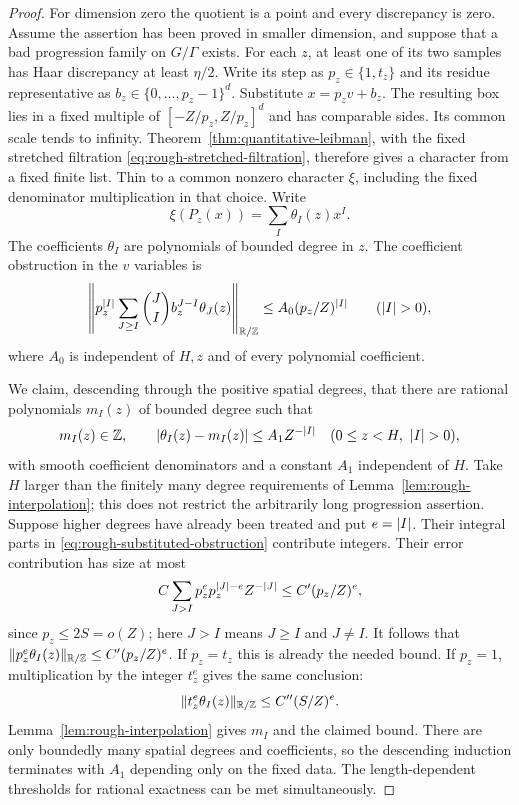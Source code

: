 \begin{proof}
For dimension zero the quotient is a point and every discrepancy is
zero.  Assume the assertion has been proved in smaller dimension, and
suppose that a bad progression family on $G/\Gamma$ exists.
For each $z$, at least one of its two samples has Haar discrepancy at
least $\eta/2$.  Write its step as $p_z\in\{1,t_z\}$ and its
residue representative as $b_z\in\{0,\ldots,p_z-1\}^d$.
Substitute $x=p_zv+b_z$.  The resulting box lies in a fixed multiple
of $[-Z/p_z,Z/p_z]^d$ and has comparable sides.  Its common scale
tends to infinity.  Theorem~\ref{thm:quantitative-leibman}, with the
fixed stretched filtration \eqref{eq:rough-stretched-filtration},
therefore gives a character from a fixed finite list.  Thin to a common
nonzero character $\xi$, including the fixed denominator multiplication
in that choice.  Write
\begin{equation}
 \xi(P_z(x))=\sum_I\theta_I(z)x^I.
 \label{eq:rough-character-polynomial}
\end{equation}
The coefficients $\theta_I$ are polynomials of bounded degree in $z$.
The coefficient obstruction in the $v$ variables is
\begin{equation}
 \left\|p_z^{\lvert I\rvert}
       \sum_{J\geq I}\binom JI b_z^{J-I}\theta_J(z)
       \right\|_{\mathbb R/\mathbb Z}
       \leq A_0(p_z/Z)^{\lvert I\rvert}
 \qquad(\lvert I\rvert>0),
 \label{eq:rough-substituted-obstruction}
\end{equation}
where $A_0$ is independent of $H,z$ and of every polynomial coefficient.

We claim, descending through the positive spatial degrees, that there
are rational polynomials $m_I(z)$ of bounded degree such that
\begin{equation}
 m_I(z)\in\mathbb Z,\qquad
 \lvert\theta_I(z)-m_I(z)\rvert\leq A_1 Z^{-\lvert I\rvert}
 \quad(0\leq z<H,\ \lvert I\rvert>0),
 \label{eq:rough-integer-coefficients}
\end{equation}
with smooth coefficient denominators and a constant $A_1$ independent
of $H$.  Take $H$ larger than the finitely many degree requirements of
Lemma~\ref{lem:rough-interpolation}; this does not restrict the
arbitrarily long progression assertion.  Suppose higher degrees have
already been treated and put $e=\lvert I\rvert$.  Their integral parts in
\eqref{eq:rough-substituted-obstruction} contribute integers.  Their
error contribution has size at most
\[
 C\sum_{J>I}p_z^e p_z^{\lvert J\rvert-e}Z^{-\lvert J\rvert}
 \leq C'(p_z/Z)^e,
\]
since $p_z\leq2S=o(Z)$; here $J>I$ means $J\geq I$ and $J\ne I$.
It follows that
$\lVert p_z^e\theta_I(z)\rVert_{\mathbb R/\mathbb Z}\leq C'(p_z/Z)^e$.
If $p_z=t_z$ this is already the needed bound.  If $p_z=1$,
multiplication by the integer $t_z^e$ gives the same conclusion:
\[
 \lVert t_z^e\theta_I(z)\rVert_{\mathbb R/\mathbb Z}\leq C''(S/Z)^e.
\]
Lemma~\ref{lem:rough-interpolation} gives $m_I$ and the claimed bound.
There are only boundedly many spatial degrees and coefficients, so
the descending induction terminates with $A_1$ depending only on the
fixed data.  The length-dependent thresholds for rational exactness
can be met simultaneously.


\end{proof}
